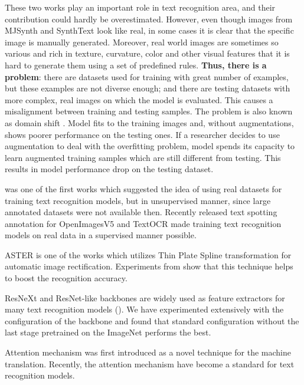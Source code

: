 \documentclass[runningheads]{llncs}
\begin{document}
These two works play an important role in text recognition area, and their contribution
could hardly be overestimated. However, even though images from MJSynth and SynthText look like
real, in some cases it is clear that the specific image is manually generated. Moreover, real
world images are sometimes so various and rich in texture, curvature, color and other visual
features that it is hard to generate them using a set of predefined rules. \textbf{Thus, there
  is a problem}: there are datasets used for training with great number of examples, but
these examples are not diverse enough; and there are testing datasets
with more complex, real images on which the model is evaluated. This causes a misalignment
between training and testing samples. The problem is also known as domain shift
\cite{michieli2020adversarial, Zhang_2019_CVPR}. Model fits to the training images and, without
augmentations, shows poorer performance on the testing ones. If a researcher decides
to use augmentation to deal with the overfitting problem, model spends its capacity to
learn augmented training samples which are still different from testing. This results in
model performance drop on the testing dataset.



\cite{baek2021STRfewerlabels} was one of the first works which suggested the idea of using
real datasets for training text recognition models, but in unsupervised manner, since
large annotated datasets were not available then. Recently released text spotting
annotation for OpenImagesV5 \cite{krylov2021open} and TextOCR \cite{textocr} made
training text recognition models on real data in a supervised manner possible.

ASTER \cite{aster} is one of the works which utilizes Thin Plate Spline transformation for
automatic image rectification. Experiments from \cite{aster} show that this technique
helps to boost the recognition accuracy.

ResNeXt \cite{ResNeXt} and ResNet-like \cite{resnet} backbones are widely used as feature
extractors for many text recognition models (\cite{aster, cstr, qiao2020seed,
  baek2019STRcomparisons}). We have experimented extensively with the configuration of the
backbone and found that standard configuration without the last stage pretrained on the
ImageNet\cite{imagenet} performs the best.

Attention mechanism \cite{bahdanau2016neural} was first introduced as a novel technique for
the machine translation. Recently, the attention mechanism have become a standard for text
recognition models.
\end{document}
